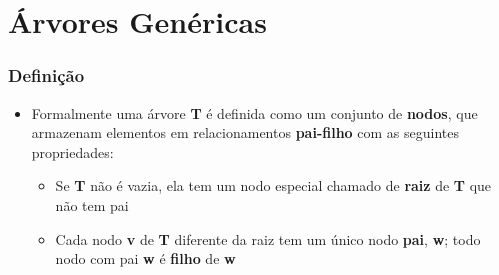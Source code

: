 \documentclass[aspectratio=169]{beamer}
\begin{document}
\section{Árvores Genéricas}

\begin{frame}\frametitle{Definição}
\begin{itemize}
	\item Formalmente uma árvore \textbf{T} é definida como um conjunto de \textbf{nodos}, que armazenam elementos em relacionamentos \textbf{pai-filho} com as seguintes propriedades:
	\begin{itemize}
		\item Se \textbf{T} não é vazia, ela tem um nodo especial chamado de \textbf{raiz} de \textbf{T} que não tem pai
		\item Cada nodo \textbf{v} de \textbf{T} diferente da raiz tem um único nodo \textbf{pai}, \textbf{w}; todo nodo com pai \textbf{w} é \textbf{filho} de \textbf{w}
	\end{itemize}
\end{itemize}
\end{frame}
\end{document}
